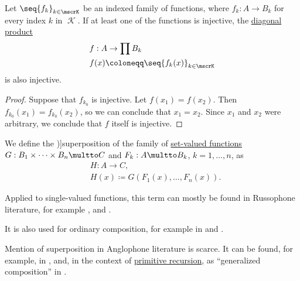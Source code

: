 \begin{lemma}\label{thm:diagonal_product_injectivity}
  Let \( \seq{ f_k }_{k \in \mscrK} \) be an indexed family of functions, where \( f_k: A \to B_k \) for every index \( k \) in \( \mscrK \). If at least one of the functions is injective, the \hyperref[def:topological_product]{diagonal product}
  \begin{equation*}
    \begin{aligned}
      &f: A \to \prod B_k \\
      &f(x) \coloneqq \seq{ f_k(x) }_{k \in \mscrK}
    \end{aligned}
  \end{equation*}
  is also injective.
\end{lemma}
\begin{proof}
  Suppose that \( f_{k_0} \) is injective. Let \( f(x_1) = f(x_2) \). Then \( f_{k_0}(x_1) = f_{k_0}(x_2) \), so we can conclude that \( x_1 = x_2 \). Since \( x_1 \) and \( x_2 \) were arbitrary, we conclude that \( f \) itself is injective.
\end{proof}

\begin{definition}\label{def:function_superposition}
  We define the \term[ru=суперпозиция, en=superposition (\cite[168]{Lorentz1966ApproximationOfFunctions})]{superposition} of the family of \hyperref[def:set_valued_function]{set-valued functions} \( G: B_1 \times \cdots \times B_n \multto C \) and \( F_k: A \multto B_k \), \( k = 1, \ldots, n \), as
  \begin{equation*}
    \begin{aligned}
      &H: A \to C, \\
      &H(x) \coloneqq G(F_1(x), \ldots, F_n(x)).
    \end{aligned}
  \end{equation*}
\end{definition}
\begin{comments}
  \item Applied to single-valued functions, this term can mostly be found in Russophone literature, for example
  \cite[395]{БелоусовТкачёв2004ДискретнаяМатематика},
  \cite[279]{Герасимов2014Вычислимость} and
  \cite[\S 25]{Фихтенгольц1968ОсновыАнализаТом2}.

  It is also used for ordinary composition, for example in
  \cite[\S 1.2.6]{КусраевКутателадзе2005БулевозначныйАнализ} and
  \cite[37]{Кострикин2020АлгебраЧасть1}.

  Mention of superposition in Anglophone literature is scarce. It can be found, for example, in \cite[168]{Lorentz1966ApproximationOfFunctions}, and, in the context of \hyperref[def:primitive_recursion]{primitive recursion}, as \enquote{generalized composition} in \cite[291]{Andrews2002Logic}.
\end{comments}

